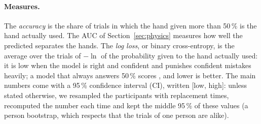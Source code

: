\paragraph{Measures.} The \emph{accuracy} is the share of trials in which the hand given more than 50\,\% is the hand
actually used. The AUC of Section~\ref{sec:physics} measures how well the predicted \pright{} separates the hands. The
\emph{log loss}, or binary cross-entropy, is the average over the trials of $-\ln$ of the probability given to the hand
actually used: it is low when the model is right and confident and punishes confident mistakes heavily; a model that
always answers 50\,\% scores , and lower is better. The main numbers come with a
95\,\% confidence interval (CI), written [low, high]: unless stated otherwise, we resampled the  participants with
replacement  times, recomputed the number each time and kept the middle 95\,\% of these values (a person
bootstrap, which respects that the trials of one person are alike).

